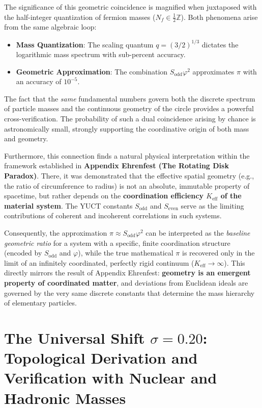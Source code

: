 \documentclass[12pt,a4paper]{article}
\begin{document}
The significance of this geometric coincidence is magnified when juxtaposed with the half-integer quantization of fermion masses (\(N_f \in \frac{1}{2}\mathbb{Z}\)). Both phenomena arise from the same algebraic loop:
\begin{itemize}
	\item \textbf{Mass Quantization}: The scaling quantum \(q = (3/2)^{1/3}\) dictates the logarithmic mass spectrum with sub-percent accuracy.
	\item \textbf{Geometric Approximation}: The combination \(S_{\mathrm{odd}}\varphi^2\) approximates \(\pi\) with an accuracy of \(10^{-5}\).
\end{itemize}
	The fact that the \emph{same} fundamental numbers govern both the discrete spectrum of particle masses and the continuous geometry of the circle provides a powerful cross-verification. The probability of such a dual coincidence arising by chance is astronomically small, strongly supporting the coordinative origin of both mass and geometry.

	Furthermore, this connection finds a natural physical interpretation within the framework established in \textbf{Appendix Ehrenfest (The Rotating Disk Paradox)}. There, it was demonstrated that the effective spatial geometry (e.g., the ratio of circumference to radius) is not an absolute, immutable property of spacetime, but rather depends on the \textbf{coordination efficiency \(K_{\mathrm{eff}}\) of the material system}. The YUCT constants \(S_{\mathrm{odd}}\) and \(S_{\mathrm{even}}\) serve as the limiting contributions of coherent and incoherent correlations in such systems. 

	Consequently, the approximation \(\pi \approx S_{\mathrm{odd}}\varphi^2\) can be interpreted as the \emph{baseline geometric ratio} for a system with a specific, finite coordination structure (encoded by \(S_{\mathrm{odd}}\) and \(\varphi\)), while the true mathematical \(\pi\) is recovered only in the limit of an infinitely coordinated, perfectly rigid continuum (\(K_{\mathrm{eff}} \to \infty\)). This directly mirrors the result of Appendix Ehrenfest: \textbf{geometry is an emergent property of coordinated matter}, and deviations from Euclidean ideals are governed by the very same discrete constants that determine the mass hierarchy of elementary particles.

\section{The Universal Shift $\sigma = 0.20$: Topological Derivation and Verification with Nuclear and Hadronic Masses}
\label{sec:sigma}
\end{document}
